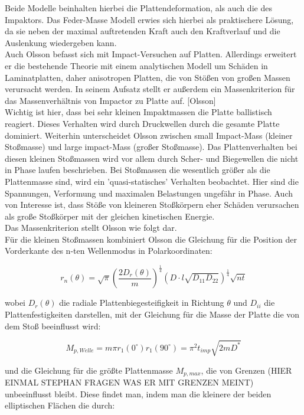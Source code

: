 Beide Modelle beinhalten hierbei die Plattendeformation, als auch die des Impaktors. Das Feder-Masse Modell erwies sich hierbei als praktischere Lösung, da sie neben der maximal auftretenden Kraft auch den Kraftverlauf und die Auslenkung wiedergeben kann. \\
Auch Olsson befasst sich mit Impact-Versuchen auf Platten. Allerdings erweitert er die bestehende Theorie mit einem analytischen Modell um Schäden in Laminatplatten, daher anisotropen Platten, die von Stößen von großen Massen verursacht werden. In seinem Aufsatz stellt er außerdem ein Massenkriterion für das Massenverhältnis von Impactor zu Platte auf. [Olsson]\\
Wichtig ist hier, dass bei sehr kleinen Impaktmassen die Platte ballistisch reagiert. Dieses Verhalten wird durch Druckwellen durch die gesamte Platte dominiert. Weiterhin unterscheidet Olsson zwischen small Impact-Mass (kleiner Stoßmasse) und large impact-Mass (großer Stoßmasse). Das Plattenverhalten bei diesen kleinen Stoßmassen wird vor allem durch Scher- und Biegewellen die nicht in Phase laufen beschrieben. Bei Stoßmassen die wesentlich größer als die Plattenmasse sind, wird ein 'quasi-statisches' Verhalten beobachtet. Hier sind die Spannungen, Verformung und maximalen Belastungen ungefähr in Phase. Auch von Interesse ist, dass Stöße von kleineren Stoßkörpern eher Schäden verursachen als große Stoßkörper mit der gleichen kinetischen Energie.\\
Das Massenkriterion stellt Olsson wie folgt dar.\\
Für die kleinen Stoßmassen kombiniert Olsson die Gleichung für die Position der Vorderkante des n-ten Wellenmodus in Polarkoordinaten:

\begin{equation}
	r_{n}(\theta) = \sqrt{\pi}(\frac{2D_{r}(\theta)}{m})^{\frac{1}{4}} (D \cdot l\sqrt{D_{11}D_{22}})^{\frac{1}{4}}\sqrt{nt}
\end{equation}

wobei $D_{r}(\theta)$ die radiale Plattenbiegesteifigkeit in Richtung $\theta$ und $D_{ii}$ die Plattenfestigkeiten darstellen, mit der Gleichung für die Masse der Platte die von dem Stoß beeinflusst wird:

\begin{equation}
	M_{p,Welle} = m \pi r_{1}(0^{\circ}) r_{1}(90^{\circ}) = \pi^{2} t_{imp} \sqrt{2mD^{*}}
\end{equation}

und die Gleichung für die größte Plattenmasse $M_{p,max}$, die von Grenzen (HIER EINMAL STEPHAN FRAGEN WAS ER MIT GRENZEN MEINT) unbeeinflusst bleibt. Diese findet man, indem man die kleinere der beiden elliptischen Flächen die durch:

